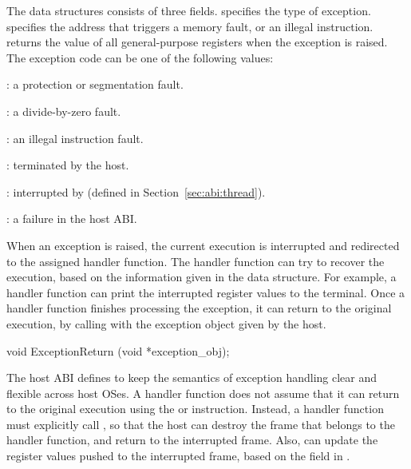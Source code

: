 The  data structures consists of three fields.
 specifies the type of exception.
 specifies the address that triggers a memory fault, or an illegal instruction.
 returns the value of all \graphenearch{} general-purpose registers
when the exception is raised.
The exception code can be one of the following values:
\begin{compactitem}
\item {}: a protection or segmentation fault.
\item {}: a divide-by-zero fault.
\item {}: an illegal instruction fault.
\item {}: terminated by the host.
\item {}: interrupted by  (defined in Section~\ref{sec:abi:thread}).
\item {}: a failure in the host ABI.
\end{compactitem}

When an exception is raised,
the current execution is interrupted and redirected to the assigned handler function.
The handler function can try to recover the execution,
based on the information given in the  data structure.
For example, a handler function
can print the interrupted register values to the terminal.
Once a handler function finishes processing the exception, it can return to the original execution,
by calling  with the exception object given by the host.


\begin{paldef}
void ExceptionReturn     (void *exception_obj);
\end{paldef}

The host ABI defines  to keep the semantics of exception handling clear and flexible
across host OSes.
A handler function does not assume that it can return to the original execution
using the  or  instruction.
Instead, a handler function must explicitly call ,
so that the host can destroy the frame that belongs to the handler function,
and return to the interrupted frame.
Also,  can update the register values pushed to the interrupted frame,
based on the  field in .



